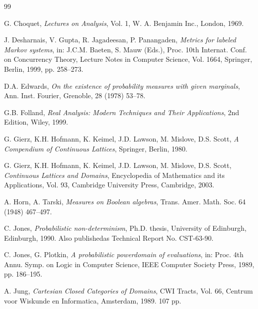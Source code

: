 \begin{thebibliography}{99}
\begin{LTR}

G. Choquet, {\em Lectures on Analysis}, Vol. 1, W. A. Benjamin Inc., London, 1969.


J. Desharnais, V. Gupta, R. Jagadeesan, P. Panangaden, {\em Metrics for labeled Markov systems}, in: J.C.M.
Baeten, S. Mauw (Eds.), Proc. 10th Internat. Conf. on Concurrency Theory, Lecture Notes in Computer
Science, Vol. 1664, Springer, Berlin, 1999, pp. 258–273.

D.A. Edwards, {\em On the existence of probability measures with given marginals}, Ann. Inst. Fourier, Grenoble,
28 (1978) 53–78.

G.B. Folland, {\em Real Analysis: Modern Techniques and Their Applications}, 2nd Edition, Wiley, 1999.

G. Gierz, K.H. Hofmann, K. Keimel, J.D. Lawson, M. Mislove, D.S. Scott, {\em A Compendium of Continuous
Lattices}, Springer, Berlin, 1980.

G. Gierz, K.H. Hofmann, K. Keimel, J.D. Lawson, M. Mislove, D.S. Scott, {\em Continuous Lattices and
Domains}, Encyclopedia of Mathematics and its Applications, Vol. 93, Cambridge University Press,
Cambridge, 2003.


A. Horn, A. Tarski, {\em Measures on Boolean algebras}, Trans. Amer. Math. Soc. 64 (1948) 467–497.

C. Jones, {\em Probabilistic non-determinism}, Ph.D. thesis, University of Edinburgh, Edinburgh, 1990. Also
publishedas Technical Report No. CST-63-90.

C. Jones, G. Plotkin, {\em A probabilistic powerdomain of evaluations}, in: Proc. 4th Annu. Symp. on Logic in
Computer Science, IEEE Computer Society Press, 1989, pp. 186–195.

A. Jung, {\em Cartesian Closed Categories of Domains}, CWI Tracts, Vol. 66, Centrum voor Wiskunde en
Informatica, Amsterdam, 1989. 107 pp.


\end{LTR}
\end{thebibliography}
